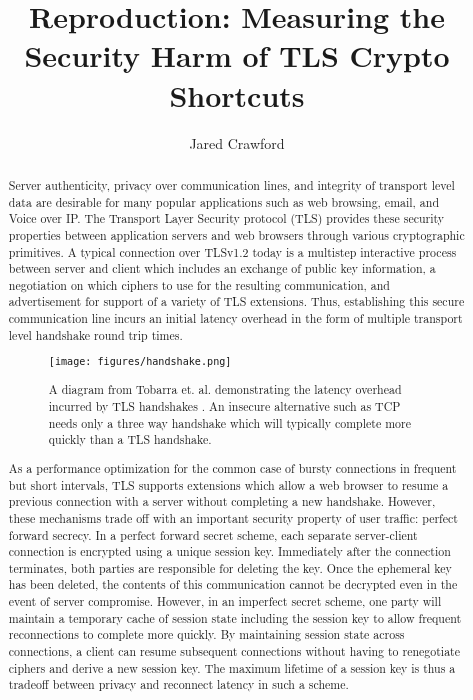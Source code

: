 \documentclass[sigconf]{acmart}
\begin{document}
\title{Reproduction: Measuring the Security Harm of TLS Crypto Shortcuts}


\author{Jared Crawford}

\renewcommand{\shortauthors}{Crawford}

\begin{abstract}
    Server authenticity, privacy over communication lines, and integrity of transport level data are desirable for many popular applications such as web browsing, email, and Voice over IP. 
    The Transport Layer Security protocol (TLS) provides these security properties between application servers and web browsers through various cryptographic primitives. 
    A typical connection over TLSv1.2 today is a multistep interactive process between server and client which includes an exchange of public key information, a negotiation on which ciphers to use for the resulting communication, and advertisement for support of a variety of TLS extensions. 
    Thus, establishing this secure communication line incurs an initial latency overhead in the form of multiple transport level handshake round trip times. 
    
    
    \begin{figure}[hp]
    \centering
    \texttt{[image: figures/handshake.png]}
    \caption{A diagram from Tobarra et. al. demonstrating the latency overhead incurred by TLS handshakes \cite{handshake}. An insecure alternative such as TCP needs only a three way handshake which will typically complete more quickly than a TLS handshake.}
    \end{figure}
    
    As a performance optimization for the common case of bursty connections in frequent but short intervals, TLS supports extensions which allow a web browser to resume a previous connection with a server without completing a new handshake. However, these mechanisms trade off with an important security property of user traffic: perfect forward secrecy. In a perfect forward secret scheme, each separate server-client connection is encrypted using a unique session key. Immediately after the connection terminates, both parties are responsible for deleting the key. Once the ephemeral key has been deleted, the contents of this communication cannot be decrypted even in the event of server compromise. However, in an imperfect secret scheme, one party will maintain a temporary cache of session state including the session key to allow frequent reconnections to complete more quickly. By maintaining session state across connections, a client can resume subsequent connections without having to renegotiate ciphers and derive a new session key. The maximum lifetime of a session key is thus a tradeoff between privacy and reconnect latency in such a scheme.
    
   
\end{abstract}
\end{document}
